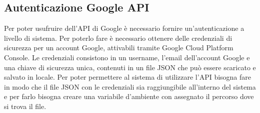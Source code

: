 \subsection{Autenticazione Google API}\label{cap:google}
Per poter usufruire dell'API di Google \`e necessario fornire un'autenticazione a livello
di sistema.
Per poterlo fare \`e necessario ottenere delle credenziali di sicurezza per un account Google,
attivabili tramite Google Cloud Platform Console.
Le credenziali consistono in un username, l'email dell'account Google e una chiave di sicurezza unica,
 contenuti in un file JSON che pu\`o essere scaricato e salvato in locale.
Per poter permettere al sistema di utilizzare l'API bisogna fare in modo che il file JSON con le credenziali sia
raggiungibile all'interno del sistema e per farlo bisogna creare una variabile d'ambiente con assegnato il percorso
dove si trova il file.

